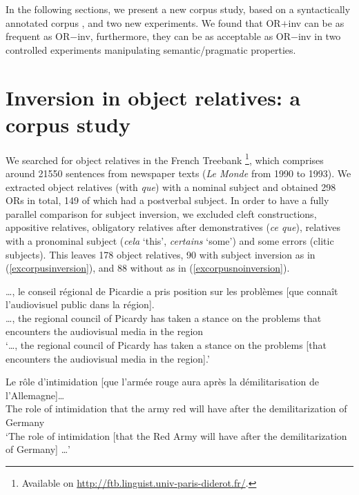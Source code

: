 \documentclass[output=paper]{langscibook}
\begin{document}
In the following sections, we present a new corpus study, based on a
syntactically annotated corpus \citep [the French
Treebank,][]{abeille2019corpus}, and two new experiments. We found
that OR$+$inv can be as frequent as OR$-$inv, furthermore, they can be
as acceptable as OR$-$inv in two controlled experiments manipulating
semantic/pragmatic properties.


\section{Inversion in object relatives: a corpus study} 


We searched for object relatives in the French Treebank \citep{abeille2019corpus}\footnote{Available on \url{http://ftb.linguist.univ-paris-diderot.fr/}.}, which comprises around 21550 sentences from newspaper texts (\textit{Le Monde} from 1990 to 1993). We extracted object relatives (with \textit{que}) with a nominal subject and obtained 298 ORs in total, 149 of which had a postverbal subject. In order to have a fully parallel comparison for subject inversion, we excluded cleft constructions, appositive relatives, obligatory relatives after demonstratives (\textit{ce que}), relatives with a pronominal subject (\textit{cela} ‘this’, \textit{certains} ‘some’) and some errors (clitic subjects). This leaves 178 object relatives, 90 with subject inversion as in (\ref{excorpusinversion}), and 88 without as in (\ref{excorpusnoinversion}). 

\begin{exe}
\ex \label{excorpusinversion}

\gll …, le conseil régional de Picardie a pris position sur les problèmes [que connaît {l’audiovisuel public} dans la région].\\    
…, the regional council  of Picardy has taken {a stance} on the problems that encounters {the audiovisual media} in the region\\
\glt `…, the regional council  of Picardy has taken a stance on the problems [that encounters the audiovisual media in the region].'


\ex \label{excorpusnoinversion}
\gll Le rôle d'intimidation [que l'armée rouge aura après la démilitarisation de l'Allemagne]…\\    
The role {of intimidation} that {the army} red {will have} after the demilitarization of Germany\\
\glt `The role of intimidation [that the Red Army will have after the demilitarization of Germany] …'

\end{exe}
\end{document}
